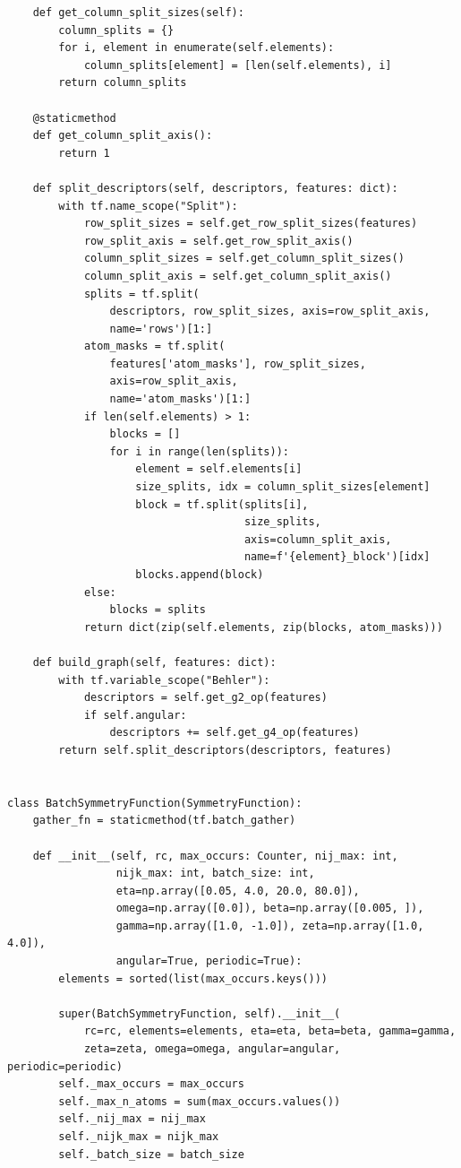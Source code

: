 \documentclass[final,1p,times]{elsarticle}
\begin{document}
\begin{verbatim}
    def get_column_split_sizes(self):
        column_splits = {}
        for i, element in enumerate(self.elements):
            column_splits[element] = [len(self.elements), i]
        return column_splits

    @staticmethod
    def get_column_split_axis():
        return 1

    def split_descriptors(self, descriptors, features: dict):
        with tf.name_scope("Split"):
            row_split_sizes = self.get_row_split_sizes(features)
            row_split_axis = self.get_row_split_axis()
            column_split_sizes = self.get_column_split_sizes()
            column_split_axis = self.get_column_split_axis()
            splits = tf.split(
                descriptors, row_split_sizes, axis=row_split_axis,
                name='rows')[1:]
            atom_masks = tf.split(
                features['atom_masks'], row_split_sizes, 
                axis=row_split_axis,
                name='atom_masks')[1:]
            if len(self.elements) > 1:
                blocks = []
                for i in range(len(splits)):
                    element = self.elements[i]
                    size_splits, idx = column_split_sizes[element]
                    block = tf.split(splits[i],
                                     size_splits,
                                     axis=column_split_axis,
                                     name=f'{element}_block')[idx]
                    blocks.append(block)
            else:
                blocks = splits
            return dict(zip(self.elements, zip(blocks, atom_masks)))

    def build_graph(self, features: dict):
        with tf.variable_scope("Behler"):
            descriptors = self.get_g2_op(features)
            if self.angular:
                descriptors += self.get_g4_op(features)
        return self.split_descriptors(descriptors, features)


class BatchSymmetryFunction(SymmetryFunction):
    gather_fn = staticmethod(tf.batch_gather)

    def __init__(self, rc, max_occurs: Counter, nij_max: int, 
                 nijk_max: int, batch_size: int, 
                 eta=np.array([0.05, 4.0, 20.0, 80.0]),
                 omega=np.array([0.0]), beta=np.array([0.005, ]),
                 gamma=np.array([1.0, -1.0]), zeta=np.array([1.0, 4.0]),
                 angular=True, periodic=True):
        elements = sorted(list(max_occurs.keys()))

        super(BatchSymmetryFunction, self).__init__(
            rc=rc, elements=elements, eta=eta, beta=beta, gamma=gamma,
            zeta=zeta, omega=omega, angular=angular, periodic=periodic)
        self._max_occurs = max_occurs
        self._max_n_atoms = sum(max_occurs.values())
        self._nij_max = nij_max
        self._nijk_max = nijk_max
        self._batch_size = batch_size


\end{verbatim}
\end{document}
